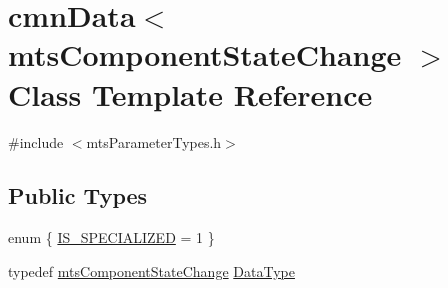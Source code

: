 \hypertarget{classcmn_data_3_01mts_component_state_change_01_4}{}\section{cmn\+Data$<$ mts\+Component\+State\+Change $>$ Class Template Reference}
\label{classcmn_data_3_01mts_component_state_change_01_4}


{\ttfamily \#include $<$mts\+Parameter\+Types.\+h$>$}

\subsection*{Public Types}
\begin{DoxyCompactItemize}
\item 
enum \{ \hyperlink{classcmn_data_3_01mts_component_state_change_01_4_a0104782860a71034155caf5a72189ceea1efff37d8dc1f83f29604a6958a4eb8d}{I\+S\+\_\+\+S\+P\+E\+C\+I\+A\+L\+I\+Z\+E\+D} = 1
 \}
\item 
typedef \hyperlink{classmts_component_state_change}{mts\+Component\+State\+Change} \hyperlink{classcmn_data_3_01mts_component_state_change_01_4_ac0a63a5c1053b74da61e82e08c0a5d7b}{Data\+Type}
\end{DoxyCompactItemize}
